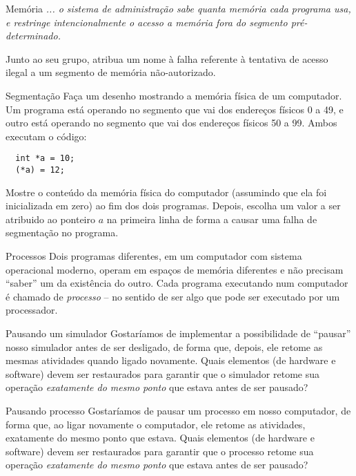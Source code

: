 \documentclass{beamer}
\begin{document}
\begin{frame}[fragile]{Memória}
  \centering
  \Large
  \textit{... o sistema de
  administração sabe quanta memória cada programa usa, e restringe
  intencionalmente o acesso a memória fora do segmento pré-determinado.}

  Junto ao seu grupo, atribua um nome à falha referente à tentativa de acesso
  ilegal a um segmento de memória não-autorizado.
\end{frame}


\begin{frame}[fragile]{Segmentação}
  \centering
  \large
  Faça um desenho mostrando a memória física de um computador. Um programa está
  operando no segmento que vai dos endereços físicos 0 a 49, e outro está operando no
  segmento que vai dos endereços físicos 50 a 99. Ambos executam o código:
  \begin{verbatim}
  int *a = 10;
  (*a) = 12;
  \end{verbatim}

  Mostre o conteúdo da memória física do computador (assumindo que ela foi
  inicializada em zero) ao fim dos dois programas. Depois, escolha um valor a
  ser atribuido ao ponteiro $a$ na primeira linha de forma a causar uma falha de
  segmentação no programa.
\end{frame}


\begin{frame}[fragile]{Processos}
  \centering
  \large
  Dois programas diferentes, em um computador com sistema operacional moderno,
  operam em espaços de memória diferentes e não precisam ``saber'' um da
  existência do outro. Cada programa executando num computador é chamado de
  \textit{processo} -- no sentido de ser algo que pode ser executado por um
  processador.
\end{frame}

\begin{frame}{Pausando um simulador}
  \large
  Gostaríamos de implementar a possibilidade de ``pausar'' nosso simulador
  antes de ser desligado, de forma que,
  depois, ele retome as mesmas atividades quando ligado novamente.
  Quais elementos (de
  hardware e software) devem ser restaurados para garantir que o simulador
  retome sua operação \textit{exatamente do mesmo ponto} que estava antes de ser
  pausado?
\end{frame}

\begin{frame}{Pausando processo}
  \large
  Gostaríamos de pausar um processo em nosso computador, de forma que, ao ligar
  novamente o computador, ele retome as atividades, exatamente do mesmo ponto
  que estava. Quais elementos (de
  hardware e software) devem ser restaurados para garantir que o processo
  retome sua operação \textit{exatamente do mesmo ponto} que estava antes de ser
  pausado?
\end{frame}
\end{document}
